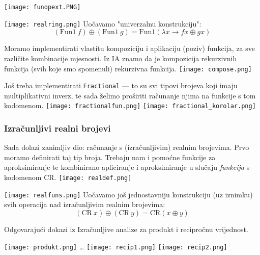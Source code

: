 \documentclass{beamer}
\def\CR{\mathrm{CR}}
\begin{document}
\begin{frame}
    \texttt{[image: funopext.PNG]}
\end{frame}
\begin{frame}
    \texttt{[image: realring.png]}
    Uočavamo "univerzalnu konstrukciju":
    \begin{equation*}
        (\mathrm{Fun1}\ f) \oplus (\mathrm{Fun1}\ g) = \mathrm{Fun1} (\lambda x\rightarrow f x \oplus g x)
    \end{equation*}
\end{frame}
\begin{frame}
    Moramo implementirati vlastitu kompoziciju i aplikaciju (poziv) funkcija, za sve različite kombinacije mjesnosti. Iz IA
    znamo da je kompozicija rekurzivnih funkcija (svih koje smo spomenuli) rekurzivna funkcija.
    \texttt{[image: compose.png]}
\end{frame}
\begin{frame}
    Još treba implementirati \texttt{Fractional} --- to su svi tipovi brojeva koji imaju multiplikativni inverz,
    te sada želimo proširiti računanje njima na funkcije s tom kodomenom.
    \texttt{[image: fractionalfun.png]}
    \texttt{[image: fractional\_korolar.png]}
\end{frame}
\begin{frame}
    \frametitle{Izračunljivi realni brojevi}
    Sada dolazi zanimljiv dio: računanje s (izračunljivim) realnim brojevima. Prvo moramo definirati taj tip broja.
    Trebaju nam i pomoćne funkcije za aproksimiranje te kombinirano apliciranje i aproksimiranje u slučaju
    \emph{funkcija} s kodomenom $\CR$.
    \texttt{[image: realdef.png]}
\end{frame}
\begin{frame}
    \texttt{[image: realfuns.png]}
    Uočavamo još jednostavniju konstrukciju (uz iznimku) svih operacija nad izračunljivim realnim brojevima:
    \begin{equation*}
        (\CR\ x) \oplus (\CR\ y) = \CR(x\oplus y)
    \end{equation*}
\end{frame}
\begin{frame}
    Odgovarajući dokazi iz Izračunljive analize za produkt i recipročnu vrijednost.

    \texttt{[image: produkt.png]}
    \mbox{\ldots}\vspace{4pt}
    \texttt{[image: recip1.png]}
    \texttt{[image: recip2.png]}
\end{frame}
\end{document}
